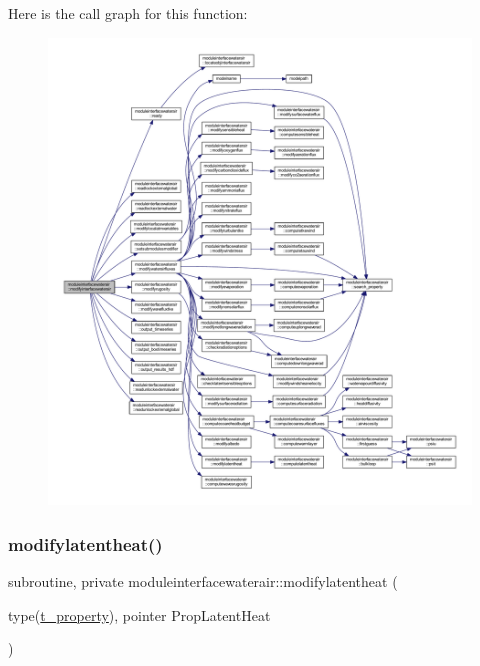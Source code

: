 Here is the call graph for this function\+:\nopagebreak
\begin{figure}[H]
\begin{center}
\leavevmode
\includegraphics[width=350pt]{namespacemoduleinterfacewaterair_ad372fa1a038ce383360d4422cc25923d_cgraph}
\end{center}
\end{figure}
\mbox{\label{namespacemoduleinterfacewaterair_a75fdc03352ad6627e770e22eddc20f05}} 
\subsubsection{\texorpdfstring{modifylatentheat()}{modifylatentheat()}}
{\footnotesize\ttfamily subroutine, private moduleinterfacewaterair\+::modifylatentheat (\begin{DoxyParamCaption}\item[{type(\mbox{\hyperlink{structmoduleinterfacewaterair_1_1t__property}{t\+\_\+property}}), pointer}]{Prop\+Latent\+Heat }\end{DoxyParamCaption})\hspace{0.3cm}{\ttfamily [private]}}

